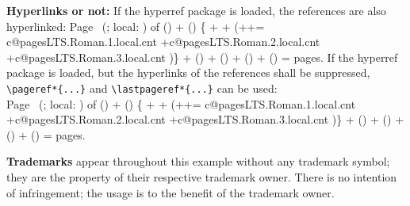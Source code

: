 \documentclass[british]{article}[2024/06/29]%
\begin{document}
\textbf{Hyperlinks or not:} If the \textsf{hyperref} package is loaded,
the references are also hyperlinked:\bigskip
\smallskip
Page \thepage\ (\theCurrentPage; local: \theCurrentPageLocal) of %
() + %
\makeatletter%
\ifpagesLTS@pagecontinue%
  () %
\else%
  \{%
   +%
   +%
  (++=%
   \the\numexpr%
    \csname c@pagesLTS.Roman.1.local.cnt\endcsname%
   +\csname c@pagesLTS.Roman.2.local.cnt\endcsname%
   +\csname c@pagesLTS.Roman.3.local.cnt\endcsname%
   \relax)\} %
\fi + %
\makeatother%
() + %
() + %
() + %
() = %
 pages.\bigskip
If the \textsf{hyperref} package is loaded, but the hyperlinks of the
references shall be suppressed, \verb|\pageref*{...}|
and \verb|\lastpageref*{...}| can be used:\\[0.5\baselineskip]
Page \thepage\ (\theCurrentPage; local: \theCurrentPageLocal) of %
() + %
\makeatletter%
\ifpagesLTS@pagecontinue%
  () %
\else%
  \{%
   +%
   +%
  (++=%
   \the\numexpr%
    \csname c@pagesLTS.Roman.1.local.cnt\endcsname%
   +\csname c@pagesLTS.Roman.2.local.cnt\endcsname%
   +\csname c@pagesLTS.Roman.3.local.cnt\endcsname%
   \relax)\} %
\fi + %
\makeatother%
() + %
() + %
() + %
() = %
 pages.\bigskip

\textbf{Trademarks} appear throughout this example without any
trademark symbol; they are the property of their respective
trademark owner. There is no intention of infringement; the
usage is to the benefit of the trademark owner.\bigskip
\end{document}
